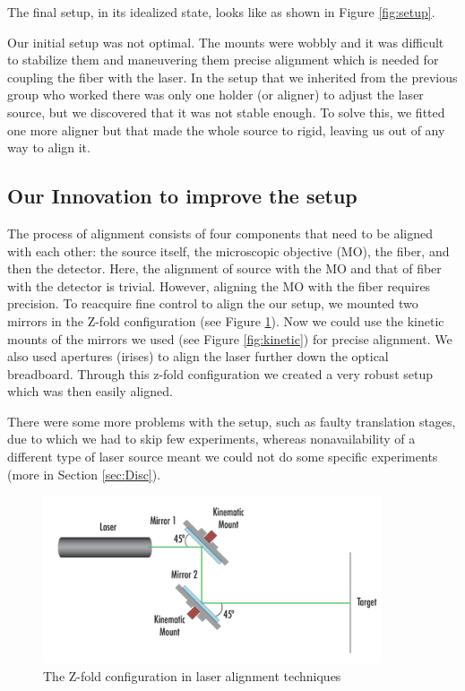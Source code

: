\documentclass[%
 reprint,
nofootinbib,
 amsmath,amssymb,
 aps,
]{revtex4-2}
\begin{document}
The final setup, in its idealized state, looks like as shown in Figure \ref{fig:setup}.


Our initial setup was not optimal. The mounts were wobbly and it was difficult to stabilize them and maneuvering them precise alignment which is needed for coupling the fiber with the laser. In the setup that we inherited from the previous group who worked there was only one holder (or aligner) to adjust the laser source, but we discovered that it was not stable enough. To solve this, we fitted one more aligner but that made the whole source to rigid, leaving us out of any way to align it. 

\subsection*{Our Innovation to improve the setup}
The process of alignment consists of four components that need to be aligned with each other: the source itself, the microscopic objective (MO), the fiber, and then the detector. Here, the alignment of source with the MO and that of fiber with the detector is trivial. However, aligning the MO with the fiber requires precision. To reacquire fine control to align the our setup, we mounted two mirrors in the Z-fold configuration (see Figure \ref{fig:zfold}). Now we could use the kinetic mounts of the mirrors we used (see Figure \ref{fig:kinetic}) for precise alignment. We also used apertures (irises) to align the laser further down the optical breadboard. Through this z-fold configuration we created a very robust setup which was then easily aligned.

There were some more problems with the setup, such as faulty translation stages, due to which we had to skip few experiments, whereas nonavailability of a different type of laser source meant we could not do some specific experiments (more in Section \ref{sec:Disc}).

\begin{figure}
	\centering
	\includegraphics{zfold}
	\caption{The Z-fold configuration in laser alignment techniques}
	\label{fig:zfold}
\end{figure}
\end{document}
